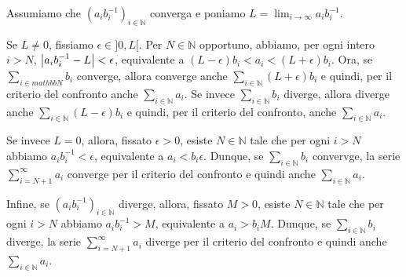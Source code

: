 \Proof Assumiamo che $(a_ib_i^{-1})_{i \in \mathbb{N}}$ converga e poniamo $L = \lim_{i \rightarrow \infty} a_ib_i^{-1}$.
\par Se $L \neq 0$, fissiamo $\epsilon \in ]0,L[$. Per $N \in \mathbb{N}$ opportuno, abbiamo, per ogni intero $i > N$, $\left \lvert a_ib_i^{-1} - L \right \rvert < \epsilon$, equivalente a $(L - \epsilon)b_i < a_i < (L + \epsilon)b_i$. Ora, se $\sum_{i \in mathbb{N}} b_i$ converge, allora converge anche $\sum_{i \in \mathbb{N}} (L + \epsilon)b_i$ e quindi, per il criterio del confronto anche $\sum_{i \in \mathbb{N}} a_i$. Se invece $\sum_{i \in \mathbb{N}} b_i$ diverge, allora diverge anche $\sum_{i \in \mathbb{N}} (L - \epsilon)b_i$ e quindi, per il criterio del confronto, anche $\sum_{i \in \mathbb{N}} a_i$.
\par Se invece $L = 0$, allora, fissato $\epsilon > 0$, esiste $N \in \mathbb{N}$ tale che per ogni $i > N$ abbiamo $a_ib_i^{-1} < \epsilon$, equivalente a $a_i < b_i \epsilon$. Dunque, se $\sum_{i \in \mathbb{N}} b_i$ convervge, la serie $\sum_{i = N + 1}^\infty a_i$ converge per il criterio del confronto e quindi anche $\sum_{i \in \mathbb{N}} a_i$.
\par Infine, se $(a_ib_i^{-1})_{i \in \mathbb{N}}$ diverge, allora, fissato $M > 0$, esiste $N \in \mathbb{N}$ tale che per ogni $i > N$ abbiamo $a_ib_i^{-1} > M$, equivalente a $a_i > b_iM$. Dunque, se $\sum_{i \in \mathbb{N}} b_i$ diverge, la serie $\sum_{i = N + 1}^\infty a_i$ diverge per il criterio del confronto e quindi anche $\sum_{i \in \mathbb{N}} a_i$.\EndProof
